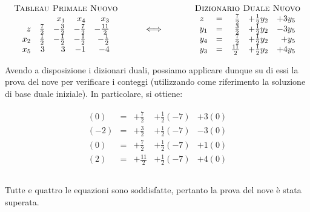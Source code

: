 \documentclass{article}
\begin{document}
  	\[
  	\begin{array}{c}
  	\mbox{\sc Tableau Primale Nuovo}\\
 	\begin{array}{rrrrr}
  	 & & x_1  & x_4 & x_3  \\
     z  &  \frac{7}{2} &  -\frac{3}{2} & -\frac{7}{2}  & -\frac{11}{2} \\  	
  	 x_2 &  \frac{1}{2} &  -\frac{1}{2} & -\frac{1}{2}   &  -\frac{1}{2} \\
  	 x_5 & 3 &  3  &  -1  &  -4 \\
  	 \end{array}
  	\end{array}
  	\hfill
  	\hspace{1cm}
  	{\Huge \Longleftrightarrow}
  	\hfill
  	\hspace{1.2cm}
  	\begin{array}{c}
  	\mbox{\sc Dizionario Duale Nuovo}\\
  	\begin{array}{lcrrr}
  	z &=& \frac{7}{2} & +\frac{1}{2}y_2 & +3y_5  \\  	
  	y_{1} &=& \frac{3}{2} & +\frac{1}{2}y_2 & -3y_5  \\
  	y_{4} &=& \frac{7}{2} & +\frac{1}{2}y_2 & +y_5  \\
  	y_{3} &=& \frac{11}{2} & +\frac{1}{2}y_2 & +4y_5  \\
  	\end{array}
  	\end{array}
  	\]
  	
  	Avendo a disposizione i dizionari duali, possiamo applicare dunque su di essi la prova del nove per verificare i conteggi (utilizzando come riferimento la soluzione di base duale iniziale). In particolare, si ottiene:
  	
	\[
	\begin{array}{c}
	\begin{array}{lclll}
	(0) &=& +\frac{7}{2} & +\frac{1}{2}(-7) & +3(0)  \\	
	(-2) &=& +\frac{3}{2}& +\frac{1}{2}(-7) & -3(0)  \\
	(0) &=& +\frac{7}{2}& +\frac{1}{2}(-7) & +1(0)  \\
	(2) &=& +\frac{11}{2}& +\frac{1}{2}(-7) & +4(0)  \\
	\end{array}\\		
	\end{array}
	\]
	
	Tutte e quattro le equazioni sono soddisfatte, pertanto la prova del nove è stata superata.
	
\end{document}
